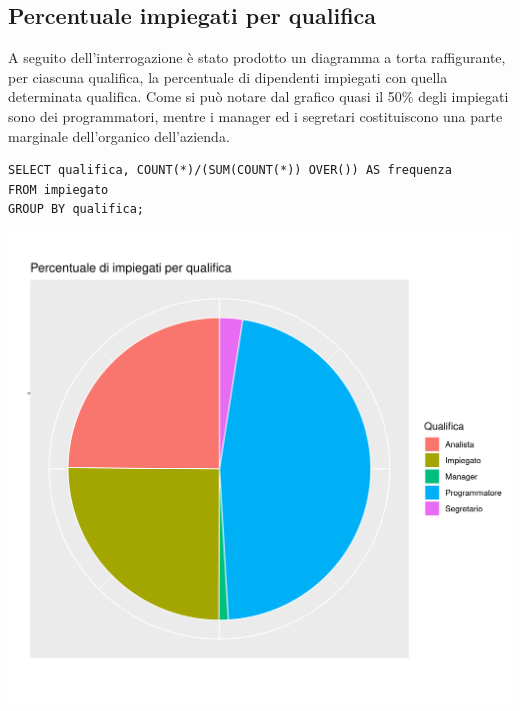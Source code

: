 \documentclass{article}
\begin{document}
\subsection{Percentuale impiegati per qualifica}
A seguito dell'interrogazione è stato prodotto un diagramma a torta raffigurante, per ciascuna qualifica, la percentuale di dipendenti impiegati con quella determinata qualifica.
\newline
Come si può notare dal grafico quasi il 50\% degli impiegati sono dei programmatori, mentre i manager ed i segretari costituiscono una parte marginale dell'organico dell'azienda.
\begin{verbatim}
SELECT qualifica, COUNT(*)/(SUM(COUNT(*)) OVER()) AS frequenza 
FROM impiegato 
GROUP BY qualifica;
\end{verbatim}
\begin{center}
\includegraphics[width=\textwidth]{plot_perc_impiegati_qualifica.png}
\end{center}

\newpage
\end{document}
